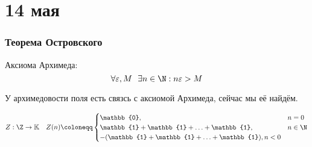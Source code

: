\chapter{14 мая}

\subsection{Теорема Островского}

\begin{remark}
	Аксиома Архимеда:
	\[\forall \varepsilon, M \ \ \exists n \in \N : n \varepsilon > M\]
\end{remark}

У архимедовости поля есть связсь с аксиомой Архимеда, сейчас мы её найдём.

\begin{definition}
	\[Z : \Z \to \mathbb{K} \quad Z(n) \coloneqq \begin{cases}
			\mathbb{0},                                    & n = 0    \\
			\mathbb{1} + \mathbb{1} + \ldots + \mathbb{1}, & n \in \N \\
			-(\mathbb{1} + \mathbb{1} + \ldots + \mathbb{1}), n < 0
		\end{cases}\]
\end{definition}

